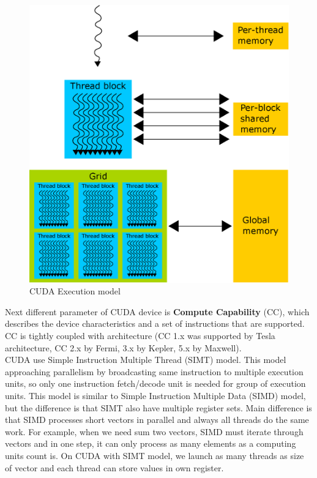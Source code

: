 \begin{figure}[h]
  \centering
  \includegraphics[width=0.8\linewidth]{img/CUDAmemoryHierarchy.eps}
  \caption{CUDA Execution model}
  \label{fig:cudamemhierarchy}
\end{figure}

Next different parameter of CUDA device is \textbf{Compute Capability} (CC), which describes the device characteristics and a set of instructions that are supported. CC is tightly coupled with architecture (CC 1.x was supported by Tesla architecture, CC 2.x by Fermi, 3.x by Kepler, 5.x by Maxwell).\\

CUDA use Simple Instruction Multiple Thread (SIMT) model. This model approaching parallelism by broadcasting same instruction to multiple execution units, so only one instruction fetch/decode unit is needed for group of execution units. This model is similar to Simple Instruction Multiple Data (SIMD) model, but the difference is that SIMT also have multiple register sets. Main difference is that SIMD processes short vectors in parallel and always all threads do the same work. For example, when we need sum two vectors, SIMD must iterate through vectors and in one step, it can only process as many elements as a computing units count is. On CUDA with SIMT model, we launch as many threads as size of vector and each thread can store values in own register.\\

